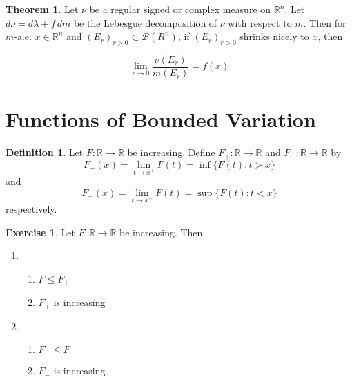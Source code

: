 \documentclass{book}
\theoremstyle{definition}
\newtheorem{defn}[definition]{Definition}
\newtheorem{thm}[definition]{Theorem}
\newtheorem{ex}[definition]{Exercise}
\newcommand{\lam}{\lambda}
\newcommand{\R}{\mathbb{R}}
\newcommand{\MB}{\mathcal{B}}
\newcommand{\ld}[1]{\label{defn:#1}}
\DeclareMathOperator*{\0}{\mbf{0}}
\DeclareMathOperator*{\1}{\mbf{1}}
\newcommand{\dm}{\, d m}
\begin{document}
	\begin{thm}
		Let $\nu$ be a regular signed or complex measure on $\R^n$. Let $d\nu = d\lam + f \dm$ be the Lebesgue decomposition of $\nu$ with respect to $m$. Then for $m$-a.e. $x \in \R^n$ and $(E_r)_{r >0} \subset \MB(R^n)$, if $(E_r)_{r >0}$ shrinks nicely to $x$, then 
		
		$$\lim_{r \rightarrow 0} \frac{\nu(E_r)}{m(E_r)} = f(x)$$
	\end{thm}
	
	
	
	
	
	
	
	
	
	
	
	
	
	
	
	
	\newpage
	\section{Functions of Bounded Variation}
	
	\begin{defn} \ld{00000} 
		Let $F:\R \rightarrow \R$ be increasing. Define $F_+:\R \rightarrow \R$ and $F_-:\R \rightarrow \R$ by $$F_+(x) = \lim_{t \rightarrow x^+}F(t) = \inf \{F(t): t>x \}$$ and $$F_-(x) =  \lim_{t \rightarrow x^-}F(t) = \sup \{F(t): t < x \}$$ respectively.
	\end{defn}
	
	\begin{ex}
		Let $F:\R \rightarrow \R$ be increasing. Then 
		\begin{enumerate}
			\item 
			\begin{enumerate}
				\item $F \leq F_+$
				\item$F_+$ is increasing
			\end{enumerate}
			\item 
			\begin{enumerate}
				\item $F_- \leq F$
				\item $F_-$ is increasing
			\end{enumerate}
		\end{enumerate}
	\end{ex}
\end{document}
